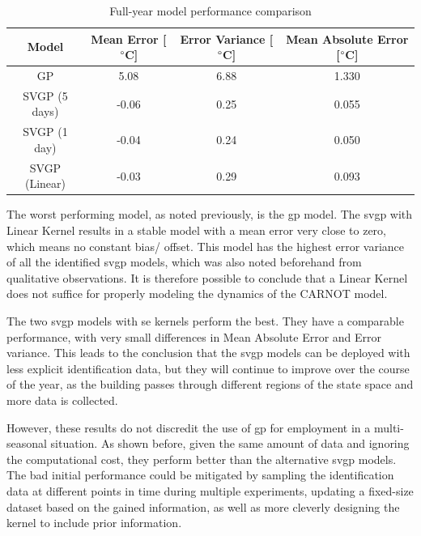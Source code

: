 \begin{table}[ht]
\centering
    \begin{tabular}{||c c c c||}
        \hline
        Model & Mean Error [$\degree$C] & Error Variance [$\degree$C] & Mean
        Absolute Error [$\degree$C]\\
        \hline \hline
        GP & 5.08 & 6.88 & 1.330 \\ 
        SVGP (5 days) & -0.06 & 0.25 & 0.055 \\ 
        SVGP (1 day) & -0.04 & 0.24 & 0.050 \\ 
        SVGP (Linear)& -0.03 & 0.29 & 0.093 \\ 
        \hline
    \end{tabular}
\caption{Full-year model performance comparison}
\label{tab:Model_comparations}
\end{table}

The worst performing model, as noted previously, is the \acrshort{gp} model. The
\acrshort{svgp} with Linear Kernel results in a stable model with a mean error
very close to zero, which means no constant bias/ offset. This model has the
highest error variance of all the identified \acrshort{svgp} models, which was
also noted beforehand from qualitative observations. It is therefore possible to
conclude that a Linear Kernel does not suffice for properly modeling the
dynamics of the CARNOT model.

The two \acrshort{svgp} models with \acrlong{se} kernels perform the best. They
have a comparable performance, with very small differences in Mean Absolute
Error and Error variance. This leads to the conclusion that the \acrshort{svgp}
models can be deployed with less explicit identification data, but they will
continue to improve over the course of the year, as the building passes through
different regions of the state space and more data is collected.

However, these results do not discredit the use of \acrlong{gp} for employment
in a multi-seasonal situation. As shown before, given the same amount of data
and ignoring the computational cost, they perform better than the alternative
\acrshort{svgp} models. The bad initial performance could be mitigated by
sampling the identification data at different points in time during multiple
experiments, updating a fixed-size dataset based on the gained information, as
well as more cleverly designing the kernel to include prior information.


\clearpage
